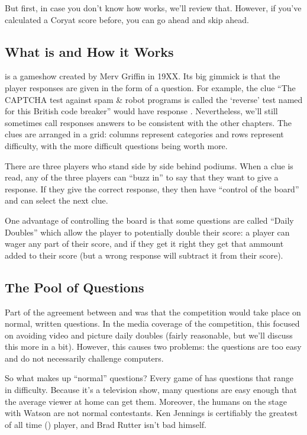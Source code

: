 But first, in case you don't know how \jeopardy{} works, we'll review
that.
%
However, if you've calculated a Coryat score before, you can go ahead
and skip ahead.

\subsection{What \jeopardy{} is and How it Works}

\jeopardy{} is a gameshow created by Merv Griffin in 19XX.
%
Its big gimmick is that the player responses are given in the form of
a question.
%
For example, the clue ``The CAPTCHA test against spam \& robot programs
is called the `reverse' test named for this British code breaker''
would have response .
%
Nevertheless, we'll still sometimes call responses answers to be
consistent with the other chapters.
%
The clues are arranged in a grid: columns represent categories and
rows represent difficulty, with the more difficult questions being
worth more.

There are three players who stand side by side behind podiums.
%
When a clue is read, any of the three players can ``buzz in'' to say
that they want to give a response.
%
If they give the correct response, they then have ``control of the
board'' and can select the next clue.

One advantage of controlling the board is that some questions are
called ``Daily Doubles'' which allow the player to potentially double
their score: a player can wager any part of their score, and if they
get it right they get that ammount added to their score (but a wrong
response will subtract it from their score).

\subsection{The Pool of Questions}

Part of the agreement between \jeopardy{} and  was that the
competition would take place on normal, written questions.
%
In the media coverage of the competition, this focused on avoiding
video and picture daily doubles (fairly reasonable, but we'll discuss
this more in a bit).
%
However, this causes two problems: the questions are too easy and do
not necessarily challenge computers.

So what makes up ``normal'' questions?
%
Every game of \jeopardy{} has questions that range in difficulty.
%
Because it's a television show, many questions are easy enough that
the average viewer at home can get them.
%
Moreover, the humans on the stage with Watson are not normal contestants.
%
Ken Jennings is certifiably the greatest of all time () \jeopardy{} player,
and Brad Rutter isn't bad himself.

